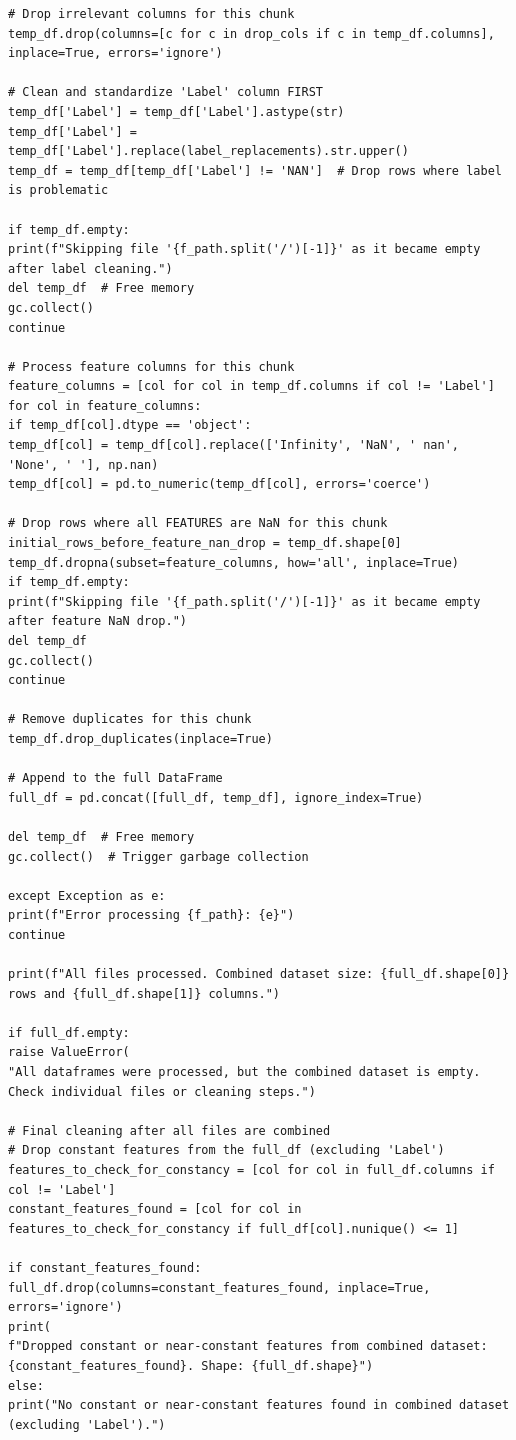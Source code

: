 \begin{lstlisting}[caption={Complete pipeline of XGBoost using CIC-IDS2017 in NIDS using Python}, label={lst:python-pipeline}]
# Drop irrelevant columns for this chunk
temp_df.drop(columns=[c for c in drop_cols if c in temp_df.columns], inplace=True, errors='ignore')

# Clean and standardize 'Label' column FIRST
temp_df['Label'] = temp_df['Label'].astype(str)
temp_df['Label'] = temp_df['Label'].replace(label_replacements).str.upper()
temp_df = temp_df[temp_df['Label'] != 'NAN']  # Drop rows where label is problematic

if temp_df.empty:
print(f"Skipping file '{f_path.split('/')[-1]}' as it became empty after label cleaning.")
del temp_df  # Free memory
gc.collect()
continue

# Process feature columns for this chunk
feature_columns = [col for col in temp_df.columns if col != 'Label']
for col in feature_columns:
if temp_df[col].dtype == 'object':
temp_df[col] = temp_df[col].replace(['Infinity', 'NaN', ' nan', 'None', ' '], np.nan)
temp_df[col] = pd.to_numeric(temp_df[col], errors='coerce')

# Drop rows where all FEATURES are NaN for this chunk
initial_rows_before_feature_nan_drop = temp_df.shape[0]
temp_df.dropna(subset=feature_columns, how='all', inplace=True)
if temp_df.empty:
print(f"Skipping file '{f_path.split('/')[-1]}' as it became empty after feature NaN drop.")
del temp_df
gc.collect()
continue

# Remove duplicates for this chunk
temp_df.drop_duplicates(inplace=True)

# Append to the full DataFrame
full_df = pd.concat([full_df, temp_df], ignore_index=True)

del temp_df  # Free memory
gc.collect()  # Trigger garbage collection

except Exception as e:
print(f"Error processing {f_path}: {e}")
continue

print(f"All files processed. Combined dataset size: {full_df.shape[0]} rows and {full_df.shape[1]} columns.")

if full_df.empty:
raise ValueError(
"All dataframes were processed, but the combined dataset is empty. Check individual files or cleaning steps.")

# Final cleaning after all files are combined
# Drop constant features from the full_df (excluding 'Label')
features_to_check_for_constancy = [col for col in full_df.columns if col != 'Label']
constant_features_found = [col for col in features_to_check_for_constancy if full_df[col].nunique() <= 1]

if constant_features_found:
full_df.drop(columns=constant_features_found, inplace=True, errors='ignore')
print(
f"Dropped constant or near-constant features from combined dataset: {constant_features_found}. Shape: {full_df.shape}")
else:
print("No constant or near-constant features found in combined dataset (excluding 'Label').")


\end{lstlisting}
